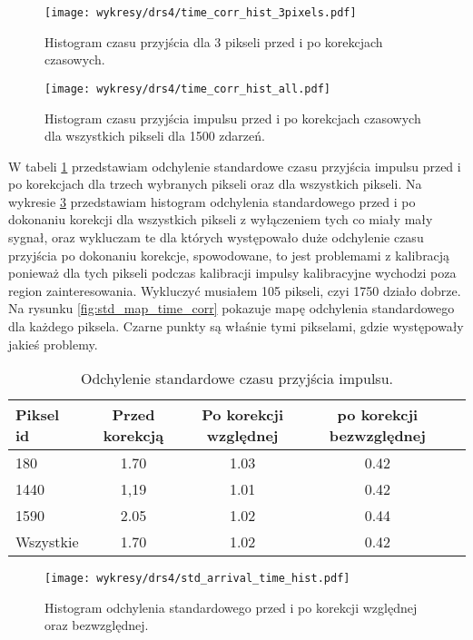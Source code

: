 \documentclass[a4paper,11pt,twoside]{article}
\begin{document}
\begin{figure}[H] 
\centering
\texttt{[image: wykresy/drs4/time\_corr\_hist\_3pixels.pdf]}
\caption{Histogram czasu przyjścia dla 3 pikseli przed i po korekcjach czasowych.}
\label{fig:time_corr_hist3}
\end{figure}
\begin{figure}[H] 
\centering
\texttt{[image: wykresy/drs4/time\_corr\_hist\_all.pdf]}
\caption{Histogram czasu przyjścia impulsu przed i po korekcjach czasowych dla wszystkich pikseli dla 1500 zdarzeń.}
\label{fig:time_corr_hist_all}
\end{figure}
W tabeli \ref{tab:std} przedstawiam odchylenie standardowe czasu przyjścia impulsu przed i po korekcjach dla trzech wybranych pikseli oraz dla wszystkich pikseli. Na wykresie \ref{fig:std_hist_time_corr} przedstawiam histogram odchylenia standardowego przed i po dokonaniu korekcji dla wszystkich pikseli z wyłączeniem tych co miały mały sygnał, oraz wykluczam te dla których występowało duże odchylenie czasu przyjścia po dokonaniu korekcje, spowodowane, to jest problemami z kalibracją ponieważ dla tych pikseli podczas kalibracji impulsy kalibracyjne wychodzi poza region zainteresowania. Wykluczyć musiałem 105 pikseli, czyi 1750 działo dobrze. Na rysunku \ref{fig:std_map_time_corr} pokazuje mapę odchylenia standardowego dla każdego piksela. Czarne punkty są właśnie tymi pikselami, gdzie występowały jakieś problemy.
\begin{table}[H]
\caption{Odchylenie standardowe czasu przyjścia impulsu.}
\begin{tabular}{|l|c|c|c|l|}
\hline
Piksel id & Przed korekcją  & Po korekcji względnej  & po korekcji bezwzględnej   \\ \hline
180  & 1.70  & 1.03  & 0.42    \\ \hline
1440 & 1,19  & 1.01  & 0.42    \\  \hline
1590 & 2.05  & 1.02  & 0.44    \\  \hline
Wszystkie & 1.70  & 1.02 & 0.42   \\  \hline
\end{tabular}
\label{tab:std}
\end{table}

\begin{figure}[H] 
\centering
\texttt{[image: wykresy/drs4/std\_arrival\_time\_hist.pdf]}
\caption{Histogram odchylenia standardowego przed i po korekcji względnej oraz bezwzględnej.}
\label{fig:std_hist_time_corr}
\end{figure}
\end{document}
